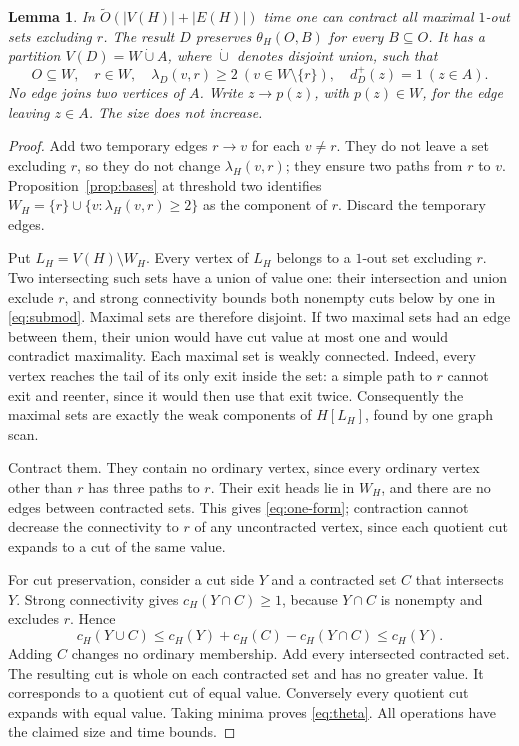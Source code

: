 \documentclass[11pt]{article}
\newtheorem{lemma}[theorem]{Lemma}
\theoremstyle{definition}
\theoremstyle{remark}
\newcommand{\OO}{\widetilde O}
\begin{document}
\begin{lemma}
\label{lem:one-out}
In \(\OO(|V(H)|+|E(H)|)\) time one can contract all maximal \(1\)-out sets excluding \(r\). The result \(D\) preserves \(\theta_H(O,B)\) for every \(B\subseteq O\). It has a partition \(V(D)=W\mathbin{\dot\cup}A\), where \(\dot\cup\) denotes disjoint union, such that
\begin{equation}
 O\subseteq W,\quad r\in W,\quad
 \lambda_D(v,r)\ge2\ (v\in W\setminus\{r\}),\quad
 d_D^+(z)=1\ (z\in A).
 \label{eq:one-form}
\end{equation}
No edge joins two vertices of \(A\). Write \(z\to p(z)\), with \(p(z)\in W\), for the edge leaving \(z\in A\). The size does not increase.
\end{lemma}
\begin{proof}
Add two temporary edges \(r\to v\) for each \(v\ne r\). They do not leave a set excluding \(r\), so they do not change \(\lambda_H(v,r)\); they ensure two paths from \(r\) to \(v\). Proposition~\ref{prop:bases} at threshold two identifies
\(W_H=\{r\}\cup\{v:\lambda_H(v,r)\ge2\}\)
as the component of \(r\). Discard the temporary edges.

Put \(L_H=V(H)\setminus W_H\). Every vertex of \(L_H\) belongs to a \(1\)-out set excluding \(r\). Two intersecting such sets have a union of value one: their intersection and union exclude \(r\), and strong connectivity bounds both nonempty cuts below by one in \eqref{eq:submod}. Maximal sets are therefore disjoint. If two maximal sets had an edge between them, their union would have cut value at most one and would contradict maximality. Each maximal set is weakly connected. Indeed, every vertex reaches the tail of its only exit inside the set: a simple path to \(r\) cannot exit and reenter, since it would then use that exit twice. Consequently the maximal sets are exactly the weak components of \(H[L_H]\), found by one graph scan.

Contract them. They contain no ordinary vertex, since every ordinary vertex other than \(r\) has three paths to \(r\). Their exit heads lie in \(W_H\), and there are no edges between contracted sets. This gives \eqref{eq:one-form}; contraction cannot decrease the connectivity to \(r\) of any uncontracted vertex, since each quotient cut expands to a cut of the same value.

For cut preservation, consider a cut side \(Y\) and a contracted set \(C\) that intersects \(Y\). Strong connectivity gives \(c_H(Y\cap C)\ge1\), because \(Y\cap C\) is nonempty and excludes \(r\). Hence
\[
 c_H(Y\cup C)\le c_H(Y)+c_H(C)-c_H(Y\cap C)\le c_H(Y).
\]
Adding \(C\) changes no ordinary membership. Add every intersected contracted set. The resulting cut is whole on each contracted set and has no greater value. It corresponds to a quotient cut of equal value. Conversely every quotient cut expands with equal value. Taking minima proves \eqref{eq:theta}. All operations have the claimed size and time bounds.
\end{proof}
\end{document}
